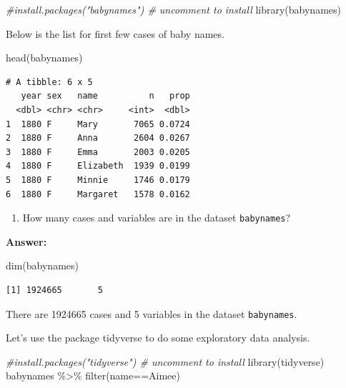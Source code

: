 \documentclass[
]{book}
\newenvironment{Shaded}{\begin{snugshade}}{\end{snugshade}}
\newcommand{\CommentTok}[1]{\textcolor[rgb]{0.56,0.35,0.01}{\textit{#1}}}
\newcommand{\FunctionTok}[1]{\textcolor[rgb]{0.00,0.00,0.00}{#1}}
\newcommand{\NormalTok}[1]{#1}
\newcommand{\SpecialCharTok}[1]{\textcolor[rgb]{0.00,0.00,0.00}{#1}}
\newcommand{\StringTok}[1]{\textcolor[rgb]{0.31,0.60,0.02}{#1}}
\providecommand{\tightlist}{%
  \setlength{\itemsep}{0pt}\setlength{\parskip}{0pt}}
\begin{document}
\begin{Shaded}
\begin{Highlighting}[]
\CommentTok{\#install.packages("babynames")  \# uncomment to install}
\FunctionTok{library}\NormalTok{(babynames)}
\end{Highlighting}
\end{Shaded}

Below is the list for first few cases of baby names.

\begin{Shaded}
\begin{Highlighting}[]
\FunctionTok{head}\NormalTok{(babynames)}
\end{Highlighting}
\end{Shaded}

\begin{verbatim}
# A tibble: 6 x 5
   year sex   name          n   prop
  <dbl> <chr> <chr>     <int>  <dbl>
1  1880 F     Mary       7065 0.0724
2  1880 F     Anna       2604 0.0267
3  1880 F     Emma       2003 0.0205
4  1880 F     Elizabeth  1939 0.0199
5  1880 F     Minnie     1746 0.0179
6  1880 F     Margaret   1578 0.0162
\end{verbatim}

\begin{enumerate}
\def\labelenumi{\arabic{enumi}.}
\tightlist
\item
  How many cases and variables are in the dataset \texttt{babynames}?
\end{enumerate}

\textbf{Answer:}

\begin{Shaded}
\begin{Highlighting}[]
\FunctionTok{dim}\NormalTok{(babynames)}
\end{Highlighting}
\end{Shaded}

\begin{verbatim}
[1] 1924665       5
\end{verbatim}

There are 1924665 cases and 5 variables in the dataset \texttt{babynames}.

Let's use the package tidyverse to do some exploratory data analysis.

\begin{Shaded}
\begin{Highlighting}[]
\CommentTok{\#install.packages("tidyverse")   \# uncomment to install}
\FunctionTok{library}\NormalTok{(tidyverse)}
\NormalTok{babynames }\SpecialCharTok{\%\textgreater{}\%} \FunctionTok{filter}\NormalTok{(name}\SpecialCharTok{==}\StringTok{\textquotesingle{}Aimee\textquotesingle{}}\NormalTok{)}
\end{Highlighting}
\end{Shaded}
\end{document}

